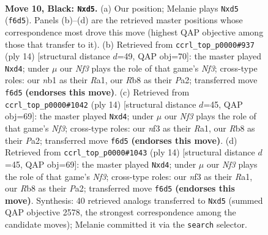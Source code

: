\documentclass[11pt]{article}
\begin{document}
\clearpage

\begin{figure}[p]\centering
\begin{subfigure}{0.46\textwidth}\centering
\resizebox{\linewidth}{!}{%
\newchessgame
\chessboard[
  setfen={1rbq1rk1/pp3pbp/2n2np1/2pPp3/7P/4PNP1/PP1P1PB1/RNBQ1RK1 b - - 0 10},
  showmover=false,
  pgfstyle=straightmove, color=movearrow, markmove={f6-d5}
]}
\caption{}
\end{subfigure}\hfill
\begin{subfigure}{0.46\textwidth}\centering
\resizebox{\linewidth}{!}{%
\newchessgame
\chessboard[
  setfen={rnbqk2r/1p2bppp/p2ppn2/8/3pP3/2N2NP1/PPP2PBP/R1BQ1RK1 w kq - 0 8},
  showmover=false,
  pgfstyle=straightmove, color=movearrow, markmove={f3-d4}
]}
\caption{}
\end{subfigure}
\\[4pt]
\begin{subfigure}{0.46\textwidth}\centering
\resizebox{\linewidth}{!}{%
\newchessgame
\chessboard[
  setfen={rnbq1rk1/pp2ppbp/3p1np1/8/2PpP3/2N2N2/PP2BPPP/R1BQ1RK1 w - - 0 8},
  showmover=false,
  pgfstyle=straightmove, color=movearrow, markmove={f3-d4}
]}
\caption{}
\end{subfigure}\hfill
\begin{subfigure}{0.46\textwidth}\centering
\resizebox{\linewidth}{!}{%
\newchessgame
\chessboard[
  setfen={rnbq1rk1/pp2ppbp/3p1np1/8/2PpP3/2N2N2/PP2BPPP/R1BQ1RK1 w - - 0 8},
  showmover=false,
  pgfstyle=straightmove, color=movearrow, markmove={f3-d4}
]}
\caption{}
\end{subfigure}
\caption{\textbf{Move 10, Black: \texttt{Nxd5}.} (a) Our position; Melanie plays \texttt{Nxd5} (\texttt{f6d5}). Panels (b)--(d) are the retrieved master positions whose correspondence most drove this move (highest QAP objective among those that transfer to it). (b) Retrieved from \texttt{ccrl\_top\_p0000\#937} (ply 14) [structural distance $d$=49, QAP obj=70]: the master played \texttt{Nxd4}; under $\mu$ our \emph{Nf3} plays the role of that game's \emph{Nf3}; cross-type roles: our \emph{n}b1 as their \emph{R}a1, our \emph{R}b8 as their \emph{P}a2; transferred move \texttt{f6d5} \textbf{(endorses this move)}. (c) Retrieved from \texttt{ccrl\_top\_p0000\#1042} (ply 14) [structural distance $d$=45, QAP obj=69]: the master played \texttt{Nxd4}; under $\mu$ our \emph{Nf3} plays the role of that game's \emph{Nf3}; cross-type roles: our \emph{n}f3 as their \emph{R}a1, our \emph{R}b8 as their \emph{P}a2; transferred move \texttt{f6d5} \textbf{(endorses this move)}. (d) Retrieved from \texttt{ccrl\_top\_p0000\#1043} (ply 14) [structural distance $d$=45, QAP obj=69]: the master played \texttt{Nxd4}; under $\mu$ our \emph{Nf3} plays the role of that game's \emph{Nf3}; cross-type roles: our \emph{n}f3 as their \emph{R}a1, our \emph{R}b8 as their \emph{P}a2; transferred move \texttt{f6d5} \textbf{(endorses this move)}. Synthesis: 40 retrieved analogs transferred to \texttt{Nxd5} (summed QAP objective 2578, the strongest correspondence among the candidate moves); Melanie committed it via the \texttt{search} selector.}
\label{fig:thought-m19}
\end{figure}
\end{document}
